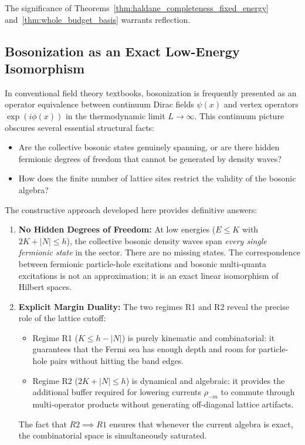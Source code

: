 The significance of Theorems~\ref{thm:haldane_completeness_fixed_energy} and~\ref{thm:whole_budget_basis} warrants reflection.

\subsection{Bosonization as an Exact Low-Energy Isomorphism}
\begin{remark}
In conventional field theory textbooks, bosonization is frequently presented as an operator equivalence between continuum Dirac fields $\psi(x)$ and vertex operators $\operatorname{exp}(i \phi(x))$ in the thermodynamic limit $L \to \infty$. This continuum picture obscures several essential structural facts:
\begin{itemize}
    \item Are the collective bosonic states genuinely spanning, or are there hidden fermionic degrees of freedom that cannot be generated by density waves?
    \item How does the finite number of lattice sites restrict the validity of the bosonic algebra?
\end{itemize}
The constructive approach developed here provides definitive answers:
\begin{enumerate}
    \item \textbf{No Hidden Degrees of Freedom:} At low energies ($E \le K$ with $2K + |N| \le h$), the collective bosonic density waves span \emph{every single fermionic state} in the sector. There are no missing states. The correspondence between fermionic particle-hole excitations and bosonic multi-quanta excitations is not an approximation; it is an exact linear isomorphism of Hilbert spaces.
    \item \textbf{Explicit Margin Duality:} The two regimes R1 and R2 reveal the precise role of the lattice cutoff:
    \begin{itemize}
        \item Regime R1 ($K \le h - |N|$) is purely kinematic and combinatorial: it guarantees that the Fermi sea has enough depth and room for particle-hole pairs without hitting the band edges.
        \item Regime R2 ($2K + |N| \le h$) is dynamical and algebraic: it provides the additional buffer required for lowering currents $\rho_{-m}$ to commute through multi-operator products without generating off-diagonal lattice artifacts.
    \end{itemize}
    The fact that $R2 \implies R1$ ensures that whenever the current algebra is exact, the combinatorial space is simultaneously saturated.
\end{enumerate}
\end{remark}


